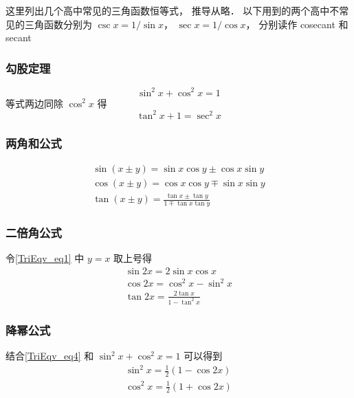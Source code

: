 

这里列出几个高中常见的三角函数恒等式， 推导从略． 以下用到的两个高中不常见的三角函数分别为 $\csc x= 1/\sin x$， $\sec x = 1/\cos x$， 分别读作 cosecant 和 secant

\subsubsection{勾股定理}

\begin{equation}
\sin^2 x + \cos^2 x = 1
\end{equation}
等式两边同除 $\cos^2 x$ 得
\begin{equation}\label{TriEqv_eq13}
\tan^2 x + 1 = \sec^2 x
\end{equation}

\subsubsection{两角和公式}
\begin{gather}\label{TriEqv_eq1}
\sin(x\pm y) = \sin x\cos y \pm \cos x\sin y\\
\label{TriEqv_eq2}
\cos(x\pm y) = \cos x\cos y \mp \sin x\sin y\\
\tan(x\pm y) = \frac{\tan x \pm \tan y}{1 \mp \tan x \tan y}
\end{gather}

\subsubsection{二倍角公式}

令\autoref{TriEqv_eq1} 中 $y=x$ 取上号得
\begin{gather}
\sin 2x = 2\sin x\cos x\\
\label{TriEqv_eq4}
\cos 2x = \cos^2 x - \sin^2 x\\
\tan 2x = \frac{2\tan x}{1 - \tan^2 x}
\end{gather}

\subsubsection{降幂公式}

结合\autoref{TriEqv_eq4} 和 $\sin^2 x + \cos^2 x = 1$ 可以得到
\begin{gather}
\sin^2 x = \frac12 (1- \cos 2x) \label{TriEqv_eq5} \\
\cos^2 x = \frac12 (1+\cos 2x) \label{TriEqv_eq6}
\end{gather}

